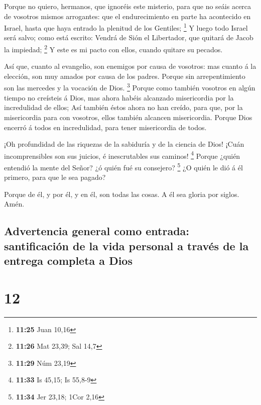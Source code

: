  Porque no quiero, hermanos, que ignoréis este misterio,
para que no seáis acerca de vosotros mismos arrogantes: que el
endurecimiento en parte ha acontecido en Israel, hasta que haya entrado
la plenitud de los Gentiles; \footnote{\textbf{11:25} Juan 10,16}
 Y luego todo Israel será salvo; como está escrito:
Vendrá de Sión el Libertador, que quitará de Jacob la impiedad;
\footnote{\textbf{11:26} Mat 23,39; Sal 14,7}  Y este es
mi pacto con ellos, cuando quitare su pecados.

 Así que, cuanto al evangelio, son enemigos por causa de
vosotros: mas cuanto á la elección, son muy amados por causa de los
padres.  Porque sin arrepentimiento son las mercedes y la
vocación de Dios. \footnote{\textbf{11:29} Núm 23,19} 
Porque como también vosotros en algún tiempo no creísteis á Dios, mas
ahora habéis alcanzado misericordia por la incredulidad de ellos;
 Así también éstos ahora no han creído, para que, por la
misericordia para con vosotros, ellos también alcancen misericordia.
 Porque Dios encerró á todos en incredulidad, para tener
misericordia de todos.

 ¡Oh profundidad de las riquezas de la sabiduría y de la
ciencia de Dios! ¡Cuán incomprensibles son sus juicios, é inescrutables
sus caminos! \footnote{\textbf{11:33} Is 45,15; Is 55,8-9}
 Porque ¿quién entendió la mente del Señor? ¿ó quién fué
su consejero? \footnote{\textbf{11:34} Jer 23,18; 1Cor 2,16}
 ¿O quién le dió á él primero, para que le sea pagado?

 Porque de él, y por él, y en él, son todas las cosas. A
él sea gloria por siglos. Amén.

\hypertarget{advertencia-general-como-entrada-santificaciuxf3n-de-la-vida-personal-a-travuxe9s-de-la-entrega-completa-a-dios}{%
\subsection{Advertencia general como entrada: santificación de la vida
personal a través de la entrega completa a
Dios}\label{advertencia-general-como-entrada-santificaciuxf3n-de-la-vida-personal-a-travuxe9s-de-la-entrega-completa-a-dios}}

\hypertarget{section-11}{%
\section{12}\label{section-11}}

